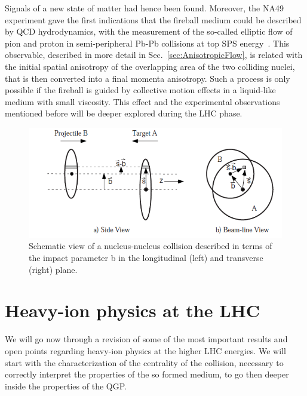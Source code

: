 Signals of a new state of matter had hence been found.
Moreover, the NA49 experiment gave the first indications that the fireball medium could be described by QCD hydrodynamics, with the measurement
of the so-called elliptic flow of pion and proton in semi-peripheral Pb-Pb collisions at top SPS energy~\cite{Alt:2003ab}. This observable, described in more detail in Sec.~\ref{sec:AnisotropicFlow}, is related with the
initial spatial anisotropy of the overlapping area of the two colliding nuclei, that is then converted into a final momenta anisotropy. Such a process is only possible if the fireball is guided by collective motion effects in a liquid-like medium with  small viscosity.
This effect and the experimental observations mentioned before will be deeper explored during the LHC phase. 
\begin{figure}[!b]
  \centering
  \includegraphics[width=12cm]{FigCap1/glauber.png}
  \caption{Schematic view of a nucleus-nucleus collision described in terms of the impact parameter b in the longitudinal (left) and transverse (right) plane.}
  \label{fig:image10}
\end{figure}

\section{Heavy-ion physics at the LHC}
We will go now through a revision of some of the most important results and open points regarding heavy-ion physics at the higher LHC energies. We will start with the characterization of the centrality of the collision, necessary to correctly interpret the properties of the so formed medium, to go then deeper inside the properties of the QGP.

